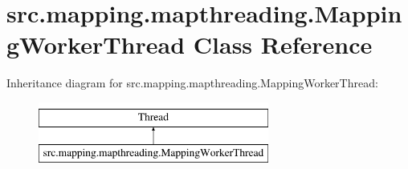 \hypertarget{classsrc_1_1mapping_1_1mapthreading_1_1_mapping_worker_thread}{}\section{src.\+mapping.\+mapthreading.\+Mapping\+Worker\+Thread Class Reference}
\label{classsrc_1_1mapping_1_1mapthreading_1_1_mapping_worker_thread}
Inheritance diagram for src.\+mapping.\+mapthreading.\+Mapping\+Worker\+Thread\+:\begin{figure}[H]
\begin{center}
\leavevmode
\includegraphics[height=2.000000cm]{classsrc_1_1mapping_1_1mapthreading_1_1_mapping_worker_thread}
\end{center}
\end{figure}
